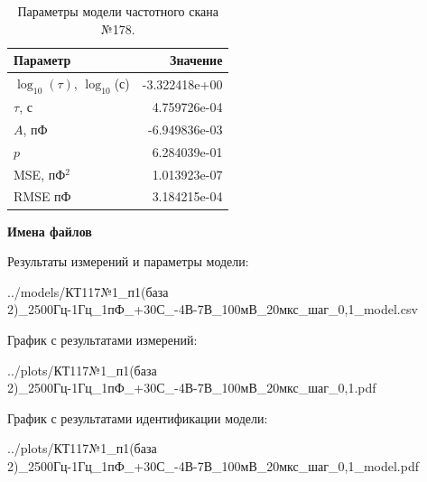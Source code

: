 \begin{table}[!ht]
    \centering
    \caption{Параметры модели частотного скана №178.}
    \begin{tabular}{|l|r|}
        \hline
        Параметр                                       & Значение                  \\ \hline
        $\log_{10}(\tau)$, $\log_{10}$(с)              & -3.322418e+00             \\ \hline
        $\tau$, с                                      & 4.759726e-04              \\ \hline
        $A$, пФ                                        & -6.949836e-03             \\ \hline
        $p$                                            & 6.284039e-01              \\ \hline
        MSE, пФ$^2$                                    & 1.013923e-07              \\ \hline
        RMSE пФ                                        & 3.184215e-04              \\ \hline
    \end{tabular}
    \label{table:frequency_scan_model_178}
\end{table}

\textbf{Имена файлов}

Результаты измерений и параметры модели:

\scriptsize../models/КТ117№1\_п1(база 2)\_2500Гц-1Гц\_1пФ\_+30С\_-4В-7В\_100мВ\_20мкс\_шаг\_0,1\_model.csv
\normalsize

График с результатами измерений:

\scriptsize../plots/КТ117№1\_п1(база 2)\_2500Гц-1Гц\_1пФ\_+30С\_-4В-7В\_100мВ\_20мкс\_шаг\_0,1.pdf
\normalsize

График с результатами идентификации модели:

\scriptsize../plots/КТ117№1\_п1(база 2)\_2500Гц-1Гц\_1пФ\_+30С\_-4В-7В\_100мВ\_20мкс\_шаг\_0,1\_model.pdf
\normalsize

